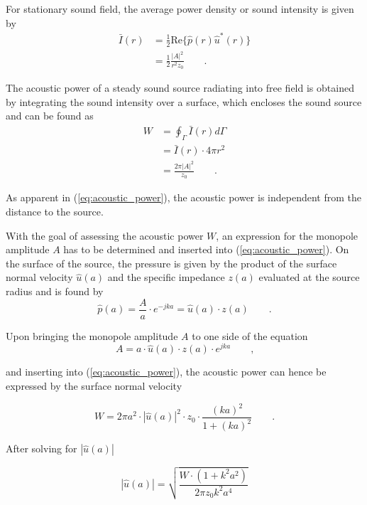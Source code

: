 For stationary sound field, the average power density or sound intensity is given by
\begin{align}
	\bar{I}(r) &= \frac{1}{2}\text{Re}\lbrace\hat{p}(r)\hat{u}^*(r)\rbrace \\
	&=\frac{1}{2}\frac{|A|^2}{r^2z_0}\qquad \text{.}
\end{align}

The acoustic power of a steady sound source radiating into free field is obtained by integrating the sound intensity over a surface, which encloses the sound source and can be found as
\begin{align}
	W &= \oint_{\Gamma} \bar{I}(r) d\Gamma \\
	  &= \bar{I}(r)\cdot 4\pi r^2 \\
	  &= \frac{2\pi |A|^2}{z_0} \qquad \text{.} \label{eq:acoustic_power}
\end{align}

As apparent in (\ref{eq:acoustic_power}), the acoustic power is independent from the distance to the source.

With the goal of assessing the acoustic power $W$, an expression for the monopole amplitude $A$ has to be determined and inserted into (\ref{eq:acoustic_power}). On the surface of the source, the pressure is given by the product of the surface normal velocity $\hat{u}(a)$ and the specific impedance $z(a)$ evaluated at the source radius and is found by
\begin{equation}
	\hat{p}(a) = \frac{A}{a}\cdot e^{-jka} = \hat{u}(a)\cdot z(a) \qquad \text{.}
\end{equation}

Upon bringing the monopole amplitude $A$ to one side of the equation
\begin{equation}
	A = a\cdot\hat{u}(a)\cdot z(a)\cdot e^{jka}\qquad\text{,}
\end{equation}

and inserting into (\ref{eq:acoustic_power}), the acoustic power can hence be expressed by the surface normal velocity

\begin{equation}
	W = 2\pi a^2\cdot|\hat{u}(a)|^2\cdot z_0 \cdot \frac{(ka)^2}{1+(ka)^2} \qquad\text{.}
\end{equation}

After solving for $|\hat{u}(a)|$

\begin{equation}
	|\hat{u}(a)| = \sqrt{\frac{W\cdot(1 + k^2a^2)}{2\pi z_0 k^2a^4}} \label{eq:input_velocity}
\end{equation}

